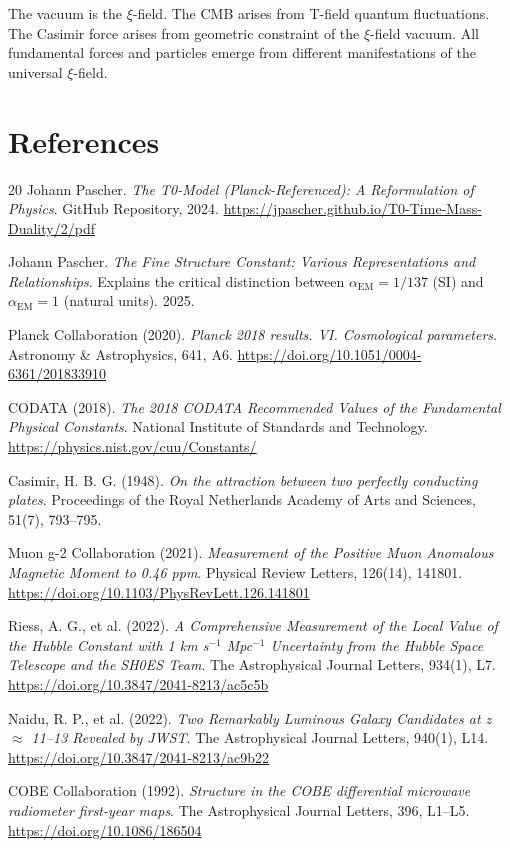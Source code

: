 	\begin{important}
		The vacuum is the $\xi$-field. The CMB arises from T-field quantum fluctuations. The Casimir force arises from geometric constraint of the $\xi$-field vacuum. All fundamental forces and particles emerge from different manifestations of the universal $\xi$-field.
	\end{important}
	
	\section{References}
	
	\begin{thebibliography}{20}
		Johann Pascher.
		\textit{The T0-Model (Planck-Referenced): A Reformulation of Physics}.
		GitHub Repository, 2024.
		\url{https://jpascher.github.io/T0-Time-Mass-Duality/2/pdf}
		
		Johann Pascher.
		\textit{The Fine Structure Constant: Various Representations and Relationships}.
		Explains the critical distinction between $\alpha_{\text{EM}} = 1/137$ (SI) and $\alpha_{\text{EM}} = 1$ (natural units).
		2025.
		
		Planck Collaboration (2020). 
		\textit{Planck 2018 results. VI. Cosmological parameters}. 
		Astronomy \& Astrophysics, 641, A6. 
		\url{https://doi.org/10.1051/0004-6361/201833910}
		
		CODATA (2018). 
		\textit{The 2018 CODATA Recommended Values of the Fundamental Physical Constants}. 
		National Institute of Standards and Technology. 
		\url{https://physics.nist.gov/cuu/Constants/}
		
		Casimir, H. B. G. (1948). 
		\textit{On the attraction between two perfectly conducting plates}. 
		Proceedings of the Royal Netherlands Academy of Arts and Sciences, 51(7), 793--795.
		
		Muon g-2 Collaboration (2021). 
		\textit{Measurement of the Positive Muon Anomalous Magnetic Moment to 0.46 ppm}. 
		Physical Review Letters, 126(14), 141801. 
		\url{https://doi.org/10.1103/PhysRevLett.126.141801}
		
		Riess, A. G., et al. (2022). 
		\textit{A Comprehensive Measurement of the Local Value of the Hubble Constant with 1 km s$^{-1}$ Mpc$^{-1}$ Uncertainty from the Hubble Space Telescope and the SH0ES Team}. 
		The Astrophysical Journal Letters, 934(1), L7. 
		\url{https://doi.org/10.3847/2041-8213/ac5c5b}
		
		Naidu, R. P., et al. (2022). 
		\textit{Two Remarkably Luminous Galaxy Candidates at z $\approx$ 11--13 Revealed by JWST}. 
		The Astrophysical Journal Letters, 940(1), L14. 
		\url{https://doi.org/10.3847/2041-8213/ac9b22}
		
		COBE Collaboration (1992). 
		\textit{Structure in the COBE differential microwave radiometer first-year maps}. 
		The Astrophysical Journal Letters, 396, L1--L5. 
		\url{https://doi.org/10.1086/186504}
	\end{thebibliography}
